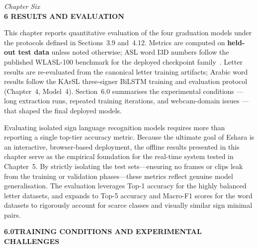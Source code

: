 \newpage

\thispagestyle{plain}

\begin{center}
    \vspace*{0.5cm}
    {\large \textit{Chapter Six}} \\[0.4cm]
    {\Large \textbf{6 \quad RESULTS AND EVALUATION}}
\end{center}
\vspace{0.45in}

\normalsize
{}

\noindent This chapter reports quantitative evaluation of the four graduation models under the protocols defined in Sections~3.9 and~4.12. Metrics are computed on \textbf{held-out test data} unless noted otherwise; ASL word I3D numbers follow the published WLASL-100 benchmark for the deployed checkpoint family~\cite{li2020wlasl}. Letter results are re-evaluated from the canonical letter training artifacts; Arabic word results follow the KArSL three-signer BiLSTM training and evaluation protocol (Chapter~4, Model~4). Section~6.0 summarises the experimental conditions --- long extraction runs, repeated training iterations, and webcam-domain issues --- that shaped the final deployed models.\par\vspace{0.3cm}

\noindent Evaluating isolated sign language recognition models requires more than reporting a single top-tier accuracy metric. Because the ultimate goal of Eshara is an interactive, browser-based deployment, the offline results presented in this chapter serve as the empirical foundation for the real-time system tested in Chapter~5. By strictly isolating the test sets---ensuring no frames or clips leak from the training or validation phases---these metrics reflect genuine model generalisation. The evaluation leverages Top-1 accuracy for the highly balanced letter datasets, and expands to Top-5 accuracy and Macro-F1 scores for the word datasets to rigorously account for scarce classes and visually similar sign minimal pairs.\par\vspace{0.4cm}

\noindent\textbf{6.0\quad TRAINING CONDITIONS AND EXPERIMENTAL CHALLENGES}\par
{}
\label{sec:ch5-training}
\vspace{0.2cm}

